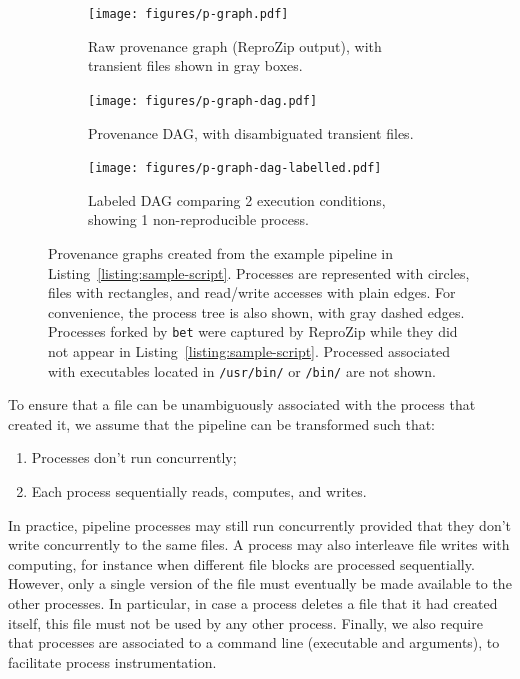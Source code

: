 \documentclass[a4paper,num-refs]{oup-contemporary}
\newcommand{\reprozip}[0]{ReproZip\xspace}
\begin{document}
\begin{figure}
  \begin{subfigure}[t]{0.3\linewidth}
    \centering
    \texttt{[image: figures/p-graph.pdf]}
    \caption{Raw provenance graph (\reprozip output), with transient files shown in gray boxes.}
    \label{fig:provenance-graph}
  \end{subfigure}
  \hfill
  \begin{subfigure}[t]{0.3\linewidth}
    \centering
    \texttt{[image: figures/p-graph-dag.pdf]}
    \caption{Provenance DAG, with disambiguated transient files.}
    \label{fig:provenance-dag}
  \end{subfigure}
  \hfill
  \begin{subfigure}[t]{0.3\linewidth}
      \centering
      \texttt{[image: figures/p-graph-dag-labelled.pdf]}
     \caption{Labeled DAG comparing 2 execution conditions, showing 1 non-reproducible process.}
     \label{fig:labeled-dag}
  \end{subfigure}
    \caption{Provenance graphs created from the example pipeline in
    Listing~\ref{listing:sample-script}. Processes are represented with
    circles, files with rectangles, and read/write accesses with plain edges. For convenience, the process tree
    is also shown, with gray dashed edges. Processes forked by
    \texttt{bet} were captured by \reprozip while they did not appear in
    Listing~\ref{listing:sample-script}. Processed associated with
    executables located in \texttt{/usr/bin/} or \texttt{/bin/} are not shown.}
    \label{fig:spot-example}
  \end{figure}

To ensure that a file can be unambiguously associated with the process that
created it, we assume that the pipeline can be transformed such that:
\begin{enumerate}
\item Processes don't run concurrently;
\item Each process sequentially reads, computes, and writes.
\end{enumerate}
In practice, pipeline processes may still run concurrently provided that
they don't write concurrently to the same files. A process may also
interleave file writes with computing, for instance when different file
blocks are processed sequentially. However, only a single version of the
file must eventually be made available to the other processes. In
particular, in case a process deletes a file that it had created itself,
this file must not be used by any other process. Finally, we also require that processes are
associated to a command line (executable and arguments), to facilitate
process instrumentation.
\end{document}
